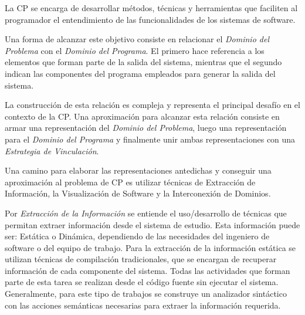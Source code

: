 \documentclass[a4paper,12pt]{report}
\begin{document}

La CP se encarga de desarrollar métodos, técnicas y herramientas que faciliten al programador el entendimiento de las funcionalidades de los sistemas de software.

Una forma de alcanzar este objetivo\cite{BRM10,MPMR07,MBPHRU10} consiste en relacionar el \textit{Dominio del Problema} con el \textit{Dominio del Programa}. El primero hace referencia a los elementos que forman parte de la salida del sistema, mientras que el segundo indican las componentes del programa empleados para generar la salida del sistema.

La construcción de esta relación es compleja y representa el principal desafío en el contexto de la CP. Una aproximación para alcanzar esta relación consiste en armar una representación del \textit{Dominio del Problema}, luego una representación para el \textit{Dominio del Programa} y finalmente unir ambas representaciones con una \textit{Estrategia de Vinculación}.






Una camino para elaborar las representaciones antedichas y conseguir una aproximación al problema de CP es utilizar técnicas de Extracción de Información, la Visualización de Software y la Interconexión de Dominios\cite{MPMR07,STOREY99,BROOK82}.


Por \textit{Extracción de la Información} se entiende el uso/desarrollo de técnicas que permitan extraer información desde el sistema de estudio. 
Esta información puede ser: Estática o Dinámica, dependiendo de las necesidades del 
ingeniero de software o del equipo de trabajo.
Para la extracción de la información estática se utilizan técnicas de compilación tradicionales\cite{AHUL06}, que se encargan de recuperar información de cada componente del sistema. Todas las actividades que forman parte de esta tarea se realizan desde el código fuente sin ejecutar el sistema. Generalmente, para este tipo de trabajos se construye un analizador sintáctico con las acciones semánticas necesarias para extraer la información requerida.
\end{document}
